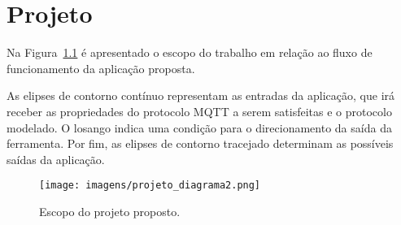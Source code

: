 \chapter{Projeto}

Na Figura~\ref{fig:proj} é apresentado o escopo do trabalho em relação ao fluxo de funcionamento da aplicação proposta. 

As elipses de contorno contínuo representam as entradas da aplicação, que irá receber as propriedades do protocolo MQTT a serem satisfeitas e o protocolo modelado. O losango indica uma condição para o direcionamento da saída da ferramenta. Por fim, as elipses de contorno tracejado determinam as possíveis saídas da aplicação.

\begin{figure}[ht]
\centering
\texttt{[image: imagens/projeto\_diagrama2.png]}
\caption{Escopo do projeto proposto.
\label{fig:proj}}
\end{figure}
\FloatBarrier

